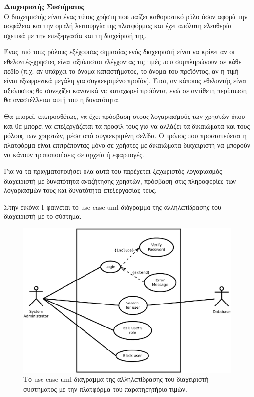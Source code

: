 \documentclass[12pt, oneside, a4paper]{report}
\begin{document}
\textbf{Διαχειριστής Συστήματος}\\
\vspace{0.5cm}
\hspace{0.6cm}Ο διαχειριστής είναι ένας τύπος χρήστη που παίζει καθοριστικό ρόλο όσον αφορά την ασφάλεια και την ομαλή λειτουργία της πλατφόρμας και έχει απόλυτη ελευθερία σχετικά με την επεξεργασία και τη διαχείρισή της. 

\hspace{0.6cm}Ένας από τους ρόλους εξέχουσας σημασίας ενός διαχειριστή είναι να κρίνει αν οι εθελοντές-χρήστες είναι αξιόπιστοι ελέγχοντας τις τιμές που συμπληρώνουν σε κάθε πεδίο (π.χ. αν υπάρχει το όνομα καταστήματος, το όνομα του προϊόντος, αν η τιμή είναι εξωφρενικά μεγάλη για συγκεκριμένο προϊόν). Έτσι, αν κάποιος εθελοντής είναι αξιόπιστος θα συνεχίζει κανονικά να καταχωρεί προϊόντα, ενώ σε αντίθετη περίπτωση θα αναστέλλεται αυτή του η δυνατότητα.

\hspace{0.6cm}Θα μπορεί, επιπροσθέτως, να έχει πρόσβαση στους λογαριασμούς των χρηστών όπου και θα μπορεί να επεξεργάζεται τα προφίλ τους για να αλλάζει τα δικαιώματα και τους ρόλους των χρηστών, μέσα από συγκεκριμένη σελίδα. Ο τρόπος που προστατεύεται η πλατφόρμα είναι επιτρέποντας μόνο σε χρήστες με δικαιώματα διαχειριστή να μπορούν να κάνουν τροποποιήσεις σε αρχεία ή εφαρμογές.

\hspace{0.6cm}Για να τα πραγματοποιήσει όλα αυτά του παρέχεται ξεχωριστός λογαριασμός διαχειριστή με δυνατότητα αναζήτησης χρηστών, πρόσβαση στις πληροφορίες των λογαριασμών τους και δυνατότητα επεξεργασίας τους.

\hspace{0.6cm}Στην εικόνα \ref{uml2} φαίνεται το use-case uml διάγραμμα της αλληλεπίδρασης του διαχειριστή με το σύστημα.

\begin{figure}[H]
   \centering
   \includegraphics[scale=0.4,keepaspectratio=true]{./admin_use_case.pdf}
   \caption{Το use-case uml διάγραμμα της αλληλεπίδρασης του διαχειριστή συστήματος με την πλατφόρμα του παρατηρητήριο τιμών.}
    \label{uml2}
\end{figure}
\end{document}
